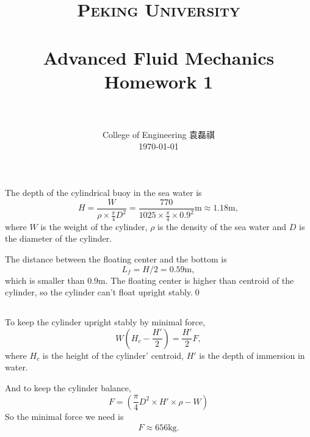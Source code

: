 \documentclass[12pt]{article}
\title{
		\vspace{-1in} 	
		\usefont{OT1}{bch}{b}{n}
		\normalfont \normalsize \textsc{\LARGE Peking University}\\[1cm] %
		\horrule{0.5pt} \\[0.5cm]
		\huge \bfseries{Advanced Fluid Mechanics Homework 1} \\
		\horrule{2pt} \\[0.5cm]
}
\author{
		\normalfont 								\normalsize
		College of Engineering \quad 2001111690  \quad 袁磊祺\\	\normalsize
        \today
}
\date{}
\begin{document}
% 

\maketitle

\section{}

\subsection{}

The depth of the cylindrical buoy in the sea water is
\begin{equation}
	H = \frac{W}{\rho \times \frac{\pi}{4} D^2} = \frac{770}{1025 \times \frac{\pi}{4} \times 0.9^2} \mathrm{m} \approx 1.18 \mathrm{m},
\end{equation}
where $W$ is the weight of the cylinder, $\rho$ is the density of the sea water and $D$ is the diameter of the cylinder.

The distance between the floating center and the bottom is
\begin{equation}
	L_f = H/2 = 0.59 \mathrm{m},
\end{equation}
which is smaller than 0.9m. The floating center is higher than centroid of the cylinder, so the cylinder can't float upright stably.\qed

\subsection{}

To keep the cylinder upright stably by minimal force,
\begin{equation}
	W \left(H_c-\frac{H'}{2}\right) = \frac{H'}{2}F ,
\end{equation}
where $H_c$ is the height of the cylinder' centroid, $H'$ is the depth of immersion in water.

And to keep the cylinder balance,
\begin{equation}
		F = \left(\frac{\pi}{4}D^2\times H'\times \rho - W\right)
\end{equation}
So the minimal force we need is
\begin{equation}
	\begin{split}
		F \approx 656 \mathrm{kg}.
	\end{split}
\end{equation}
\end{document}
